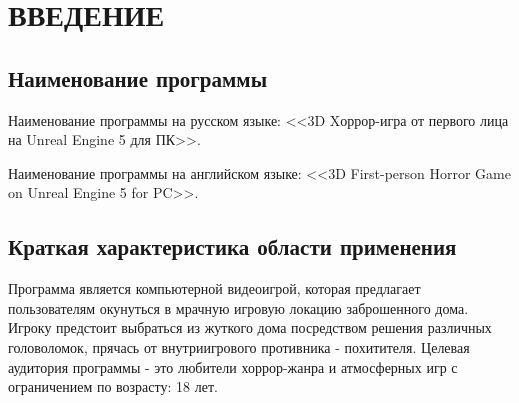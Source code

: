 \section{ВВЕДЕНИЕ}

\subsection{Наименование программы}

Наименование программы на русском языке: <<3D Xоррор-игра от первого лица на Unreal Engine 5 для ПК>>.

Наименование программы на английском языке:  <<3D First-person Horror Game on Unreal Engine 5 for PC>>.

\subsection{Краткая характеристика области применения}

Программа является компьютерной видеоигрой, 
которая предлагает пользователям окунуться в мрачную игровую локацию заброшенного дома.  
Игроку предстоит выбраться из жуткого дома посредством решения различных головоломок, прячась от внутриигрового противника - похитителя.
Целевая аудитория программы - это любители хоррор-жанра и атмосферных игр с ограничением по возрасту: 18 лет.

